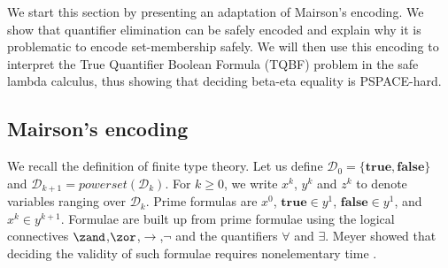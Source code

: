 We start this section by presenting an adaptation of Mairson's
encoding. We show that quantifier elimination can be safely encoded
and explain why it is problematic to encode set-membership safely.
We will then use this encoding to interpret the True Quantifier
Boolean Formula (TQBF) problem in the safe lambda calculus, thus
showing that deciding beta-eta equality is PSPACE-hard.

\subsection{Mairson's encoding}
\label{sec:mairsonenc} We recall the definition of finite type
theory. Let us define $\mathcal{D}_0 =
\{\mathbf{true},\mathbf{false}\}$ and $\mathcal{D}_{k+1}
=powerset(\mathcal{D}_k)$. For $k\geq0$, we write $x^k$, $y^k$ and
$z^k$ to denote variables ranging over $\mathcal{D}_k$. Prime
formulas are $x^0$, $\mathbf{true}\in y^1$, $\mathbf{false}\in y^1$,
and  $x^k \in y^{k+1}$. Formulae are built up from prime formulae
using the logical connectives $\zand$,$\zor$,$\rightarrow$,$\neg$
and the quantifiers $\forall$ and $\exists$. Meyer showed that
deciding the validity of such formulae requires nonelementary time
\cite{Meyer1974}.
\smallskip

